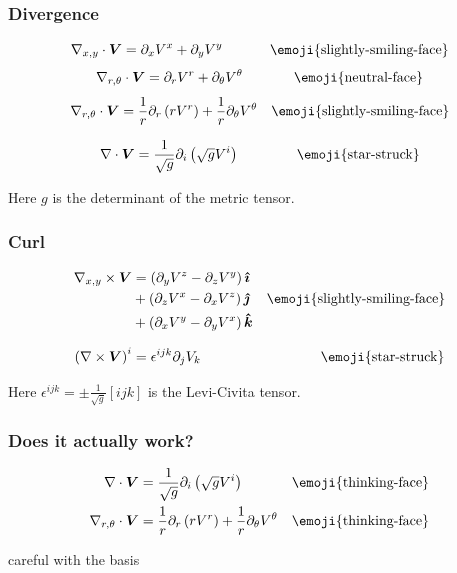 \documentclass{beamer}
\begin{document}
\begin{frame}
\frametitle{Divergence}
\begin{equation*}
\nabla_{x,y}\cdot \boldsymbol{V} = \partial_x V^x +\partial_y V^y \qquad\;\;\;\;\; \text{\emoji{slightly-smiling-face}}
\end{equation*}
\pause
\begin{equation*}
\nabla_{r,\theta}\cdot \boldsymbol{V} = \partial_r V^r +\partial_\theta V^\theta \qquad\;\;\;\;\;\; \text{\emoji{neutral-face}}
\end{equation*}
\pause
\begin{equation*}
	\nabla_{r,\theta}\cdot \boldsymbol{V} = \frac{1}{r}\partial_r\left(rV^r\right) +\frac{1}{r}\partial_\theta V^\theta \quad \text{\emoji{slightly-smiling-face}}
\end{equation*}
\pause
\begin{framed}
\begin{equation*}
\nabla\cdot \boldsymbol{V} = \frac{1}{\sqrt{g}}\partial_i\left(\sqrt{g}V^i\right) \qquad\quad\;\;\;\; \text{\emoji{star-struck}}
\end{equation*}
\end{framed}

Here $g$ is the determinant of the metric tensor.
\end{frame}

\begin{frame}
\frametitle{Curl}
\begin{align*}
	\nabla_{x,y}\times \boldsymbol{V}
	&=\left(\partial_y V^z -\partial_z V^y \right)\boldsymbol{\hat{\imath}}
	&\\
	&+\left(\partial_z V^x -\partial_x V^z \right)\boldsymbol{\hat{\jmath}}
	&\text{\emoji{slightly-smiling-face}}\\
	&+\left(\partial_x V^y -\partial_y V^x \right)\boldsymbol{\hat{k}} &
\end{align*}
\begin{framed}
\begin{equation*}
\left(\nabla\times \boldsymbol{V}\right)^i =\epsilon^{ijk}\partial_jV_k
\qquad
\qquad
\qquad
\qquad
\;\;
\text{\emoji{star-struck}}
\end{equation*}
\end{framed}

Here $\epsilon^{ijk}=\pm \frac{1}{\sqrt{g}}[ijk]$ is the Levi-Civita tensor.
\end{frame}

\begin{frame}
\frametitle{Does it actually work?}
\begin{align*}
	\nabla\cdot \boldsymbol{V} &=
\frac{1}{\sqrt{g}}\partial_i\left(\sqrt{g}V^i\right)
				   &\text{\emoji{thinking-face}}\\
	\nabla_{r,\theta}\cdot \boldsymbol{V} &= \frac{1}{r}\partial_r\left(rV^r\right)
	+\frac{1}{r}\partial_\theta V^\theta &\text{\emoji{thinking-face}}
\end{align*}
\pause

\centering

 careful with the basis
\end{frame}
\end{document}
